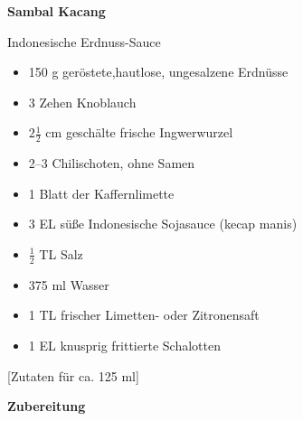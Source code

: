 
\parindent0pt	

\pagestyle{empty}


\textbf{{\LARGE Sambal Kacang}}%

\hrulefill

Indonesische Erdnuss-Sauce
\vspace*{\fill}
\begin{multicols}{2}	


\begin{itemize}
\item 150 g geröstete,hautlose, ungesalzene Erdnüsse%
\item 3 Zehen Knoblauch%
\item $2\frac{1}{2}$ cm geschälte frische Ingwerwurzel %
\item 2–3 Chilischoten, ohne Samen%
\item 1 Blatt der Kaffernlimette %
\item 3 EL süße Indonesische Sojasauce (kecap manis) %

\item $\frac{1}{2}$ TL Salz%
\item 375 ml Wasser%
\item 1 TL frischer Limetten- oder Zitronensaft%
\item 1 EL knusprig frittierte Schalotten%


\end{itemize}

\end{multicols}

\vspace{1cm}
\begin{center}
[Zutaten für ca. 125 ml]
\end{center}


\vfill
\newpage
\textbf{{\LARGE Zubereitung}}%

\hrulefill

